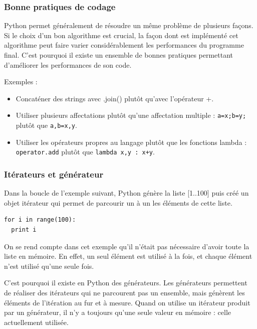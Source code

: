 \documentclass[a4paper]{article}
\begin{document}
\label{OptCode}

\subsubsection{Bonne pratiques de codage}

Python permet généralement de résoudre un même problème de plusieurs
façons. Si le choix d'un bon algorithme est crucial, la façon dont est
implémenté cet algorithme peut faire varier considérablement les
performances du programme final. C'est pourquoi il existe un ensemble
de bonnes pratiques permettant d'améliorer les performances de son
code\cite{PythonSpeed}.


Exemples :
\begin{itemize}
\item Concaténer des strings avec .join() plutôt qu'avec l'opérateur +.
\item Utiliser plusieurs affectations plutôt qu'une affectation
  multiple : \lstinline|a=x;b=y;| plutôt que \lstinline|a,b=x,y|.
\item Utiliser les opérateurs propres au langage plutôt que les
  fonctions lambda : \lstinline|operator.add| plutôt que \lstinline|lambda x,y : x+y|.
\end{itemize}

\subsubsection{Itérateurs et générateur}

Dans la boucle de l'exemple suivant, Python génère la liste [1..100]
puis créé un objet itérateur qui permet de parcourir un à un les
éléments de cette liste.

\begin{lstlisting}
for i in range(100):
  print i
\end{lstlisting}

On se rend compte dans cet exemple qu'il n'était pas nécessaire
d'avoir toute la liste en mémoire. En effet, un seul élément est
utilisé à la fois, et chaque élément n'est utilisé qu'une seule fois.

C'est pourquoi il existe en Python des générateurs. Les générateurs
permettent de réaliser des itérateurs qui ne parcourent pas un
ensemble, mais génèrent les éléments de l'itération au fur et à
mesure. Quand on utilise un itérateur produit par un générateur, il
n'y a toujours qu'une seule valeur en mémoire : celle actuellement
utilisée.
\end{document}
